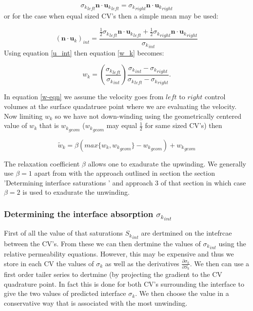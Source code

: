 \begin{equation}
{\sigma_k}_{left} {{\mathbf n}\cdot{\mathbf u}_k}_{left} =  {\sigma_k}_{right} {{\mathbf n}\cdot{\mathbf u}_k}_{right}
\label{u_int} 
\end{equation}
or for the case when equal sized CV's then a simple mean may be used:

\begin{equation}
({{\mathbf n}\cdot{\mathbf u}_k})_{int}= \frac{\frac{1}{2} {\sigma_k}_{left}{{\mathbf n}\cdot{\mathbf u}_k}_{left}  
+ \frac{1}{2}{\sigma_k}_{right} {{\mathbf n}\cdot{\mathbf u}_k}_{right}}{{\sigma_k}_{int}}
\end{equation}
Using equation \ref{u_int} then equation \ref{w_k} becomes:

\begin{equation}
w_k=\left( \frac{{\sigma_k}_{left}}{{\sigma_k}_{int}} \right) 
\frac{ {\sigma_k}_{int} - {\sigma_k}_{right}} 
{ {\sigma_k}_{left} - {\sigma_k}_{right}} 
\label{w-eqn}. 
\end{equation}

In equation \ref{w-eqn} we assume the velocity goes from $left$ to $right$ 
control volumes at the surface quadatruee point 
where we are evaluating the velocity. Now limiting 
$w_k$ so we have not down-winding using the 
geometrically centered value of $w_k$ that is ${w_k}_{geom}$ 
(${w_k}_{geom}$ may equal $\frac{1}{2}$ for same sized CV's) 
then

\begin{equation}
\tilde w_k=\beta (max\{ w_k, {w_k}_{geom} \}-{w_k}_{geom}) + {w_k}_{geom}
\end{equation}

The relaxation coefficient $\beta$ allows one to 
exadurate the upwinding. We generally use $\beta=1$ apart 
from with the approach outlined in section 
the section '{Determining interface saturations  }' 
and approach 3 of that section in which case $\beta=2$ is 
used to exadurate the unwinding.  



\subsubsection{Determining the interface absorption ${\sigma_k}_{int}$ }

First of all the value of that saturations ${S_k}_{int}$ 
are dertmined on the intefrcae between the CV's. 
From these we can then dertmine the values of ${\sigma_k}_{int}$ 
using the relative permeability equations. However, 
this may be expensive and thus we store 
in each CV the values of $\sigma_k$ as well 
as the derivatives $\frac{\partial \sigma_k}{\partial S_k}$. We then 
can use a first order tailer series to dertmine 
(by projecting the gradient 
to the CV quadrature point. In fact this is done for 
both CV's surrounding the interface to give the 
two values of predicted interface ${\sigma_k}$. 
We then choose the value in a conservative way that 
is associated with the most unwinding. 

